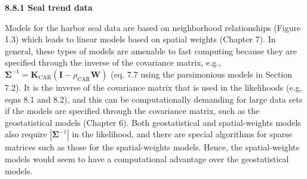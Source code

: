 \documentclass[12pt, titlepage]{article}
\begin{document}
\setcounter{equation}{0}
\renewcommand{\theequation}{R.\arabic{equation}}


%
%

{\large \flushleft \textbf{8.8.1 Seal trend data}}

\vspace{.3cm}

Models for the harbor seal data are based on neighborhood relationships (Figure 1.3) which leads to linear models based on spatial weights (Chapter 7). In general, these types of models are amenable to fast computing because they are specified through the inverse of the covariance matrix, e.g., $\boldsymbol{\Sigma}^{-1} = \mathbf{K}_{\textrm{CAR}}(\mathbf{I} - \rho_{\textrm{CAR}}\mathbf{W})$ (eq. 7.7 using the parsimonious models in Section 7.2).  It is the inverse of the covariance matrix that is used in the likelihoods (e.g, eqns 8.1 and 8.2), and this can be computationally demanding for large data sets if the models are specified through the covariance matrix, such as the geostatistical models (Chapter 6).  Both geostatistical and spatial-weights models also require $|\boldsymbol{\Sigma}^{-1}|$ in the likelihood, and there are special algorithms for sparse matrices such as those for the spatial-weights models.  Hence, the spatial-weights models would seem to have a computational advantage over the geostatistical models.
\end{document}
